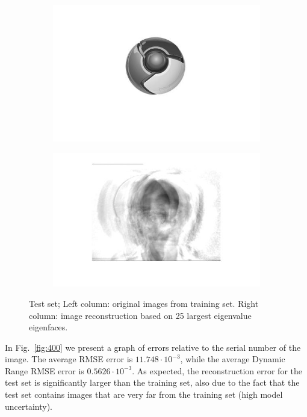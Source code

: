 \documentclass[a4paper]{iacas}
\begin{document}
\begin{figure}[!htbp]
	\begin{subfigure}[b]{0.4\textwidth}
		\includegraphics[width=\textwidth]{4012.jpg}
		\caption{}
		\label{fig:4012}
	\end{subfigure}
	\begin{subfigure}[b]{0.4\textwidth}
		\includegraphics[width=\textwidth]{4011.jpg}
		\caption{}
		\label{fig:4011}
	\end{subfigure}
	
	\caption{Test set; Left column: original images from training set. Right column: image reconstruction based on 25 largest eigenvalue eigenfaces.}
	\label{fig:4000}
\end{figure}

In Fig.~\ref{fig:400} we present a graph of errors relative to the serial number of the image. The average RMSE error is $11.748 \cdot 10^{-3}$, while the average Dynamic Range RMSE error is $0.5626 \cdot 10^{-3}$. As expected, the reconstruction error for the test set is significantly larger than the training set, also due to the fact that the test set contains images that are very far from the training set (high model uncertainty).
\end{document}
